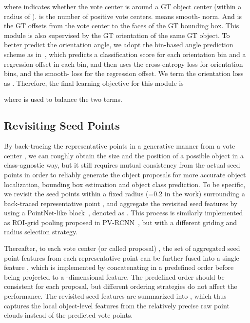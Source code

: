 \documentclass[final]{cvpr}
\begin{document}
where  indicates whether the vote center  is around a GT object center (within a radius of ).
 is the number of positive vote centers.
 means smooth- norm.
And  is the GT offsets from the vote center  to the  faces of the GT bounding box.
This module is also supervised by the GT orientation of the same GT object.
To better predict the orientation angle, we adopt the bin-based angle prediction scheme as in~\cite{f-pointnet}, which predicts a classification score for each orientation bin and a regression offset in each bin, and then uses the cross-entropy loss for orientation bins, and the smooth- loss for the regression offset.
We term the orientation loss as .
Therefore, the final learning objective for this module is 

where  is used to balance the two terms.


\subsection{Revisiting Seed Points}

By back-tracing the representative points  in a generative manner from a vote center , we can roughly obtain the size and the position of a possible object in a class-agnostic way, but it still requires mutual consistency from the actual seed points in order to reliably generate the object proposals for more accurate object localization, bounding box estimation and object class prediction.
To be specific, we revisit the seed points  within a fixed radius (=0.2 in the work) surrounding a back-traced representative point , and aggregate the revisited seed features by using a PointNet-like block~\cite{pointnet}, denoted as .
This process is similarly implemented as ROI-grid pooling proposed in PV-RCNN~\cite{pvrcnn}, but with a different griding and radius selection strategy.





Thereafter, to each vote center (or called proposal) , the set of aggregated seed point features  from each representative point  can be further fused into a single feature , which is implemented by concatenating  in a predefined order before being projected to a -dimensional feature.
The predefined order should be consistent for each proposal, but different ordering strategies do not affect the performance.
The revisited seed features are summarized into , which thus captures the local object-level features from the relatively precise raw point clouds instead of the predicted vote points.
\end{document}
